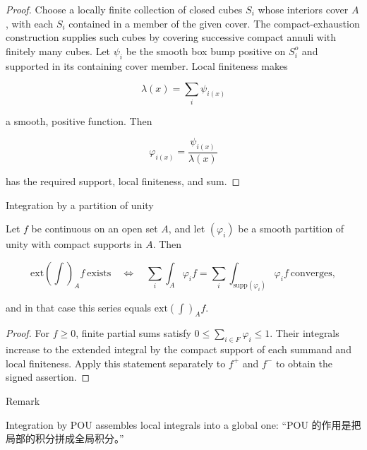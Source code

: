 \begin{proof}

Choose a locally finite collection of closed cubes \(S_{i}\) whose interiors cover \(A\), with each \(S_{i}\) contained in a member of the given cover. The compact-exhaustion construction supplies such cubes by covering successive compact annuli with finitely many cubes. Let \(\psi_{i}\) be the smooth box bump positive on \(S_{i}^{o}\) and supported in its containing cover member. Local finiteness makes

\[\lambda(x) = \sum\limits_{i}\psi_{i{(x)}}\]

a smooth, positive function. Then

\[\varphi_{i{(x)}} = \frac{\psi_{i{(x)}}}{\lambda(x)}\]

has the required support, local finiteness, and sum.

\end{proof}

\begin{theorem}{Integration by a partition of unity}

Let \(f\) be continuous on an open set \(A\), and let \(\left( \varphi_{i} \right)\) be a smooth partition of unity with compact supports in \(A\). Then

\[\text{ext}(\int)_{A}f\ \text{exists}\quad\Leftrightarrow\quad\sum\limits_{i}\int_{A}\varphi_{i}f = \sum\limits_{i}\int_{\text{supp}{(\varphi_{i})}}\varphi_{i}f\ \text{converges},\]

and in that case this series equals \(\text{ext}(\int)_{A}f\).

\end{theorem}

\begin{proof}

For \(f \geq 0\), finite partial sums satisfy \(0 \leq \sum_{i \in F}\varphi_{i} \leq 1\). Their integrals increase to the extended integral by the compact support of each summand and local finiteness. Apply this statement separately to \(f^{+}\) and \(f^{-}\) to obtain the signed assertion.

\end{proof}

\begin{qlremark}{Remark}

Integration by POU assembles local integrals into a global one: ``POU 的作用是把局部的积分拼成全局积分。''

\end{qlremark}
